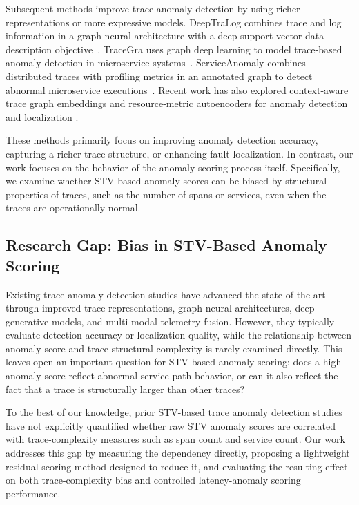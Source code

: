 \documentclass[informatics,article,submit,moreauthors]{Definitions/mdpi}
\begin{document}
Subsequent methods improve trace anomaly detection by using richer
representations or more expressive models. DeepTraLog combines trace and
log information in a graph neural architecture with a deep support vector
data description objective~\cite{zhang2022deeptralog, xu2023deep}. TraceGra uses
graph deep learning to model trace-based anomaly detection in
microservice systems~\cite{chen2023tracegra}. ServiceAnomaly combines
distributed traces with profiling metrics in an annotated graph to
detect abnormal microservice executions~\cite{panahandeh2024serviceanomaly}.
Recent work has also explored context-aware trace graph embeddings and
resource-metric autoencoders for anomaly detection and localization
\cite{alomari2025contextaware,xing2025multidim, kohyarnejadfard2022anomaly}.

These methods primarily focus on improving anomaly detection accuracy,
capturing a richer trace structure, or enhancing fault localization. In
contrast, our work focuses on the behavior of the anomaly scoring process
itself. Specifically, we examine whether STV-based anomaly scores can be
biased by structural properties of traces, such as the number of spans or
services, even when the traces are operationally normal.

\subsection{Research Gap: Bias in STV-Based Anomaly Scoring}

Existing trace anomaly detection studies have advanced the state of the
art through improved trace representations, graph neural architectures,
deep generative models, and multi-modal telemetry fusion. However, they
typically evaluate detection accuracy or localization quality, while the
relationship between anomaly score and trace structural complexity is
rarely examined directly. This leaves open an important question for
STV-based anomaly scoring: does a high anomaly score reflect abnormal
service-path behavior, or can it also reflect the fact that a trace is
structurally larger than other traces?

To the best of our knowledge, prior STV-based trace anomaly detection
studies have not explicitly quantified whether raw STV anomaly scores
are correlated with trace-complexity measures such as span count and
service count. Our work addresses this gap by measuring the dependency
directly, proposing a lightweight residual scoring method designed to
reduce it, and evaluating the resulting effect on both trace-complexity
bias and controlled latency-anomaly scoring performance.
\end{document}
